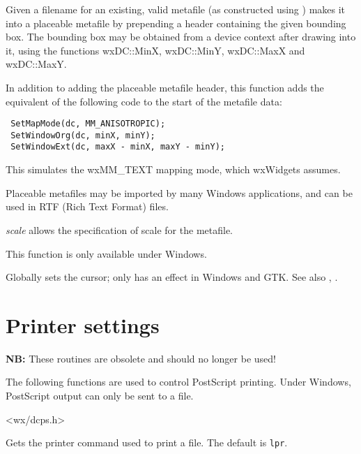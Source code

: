 Given a filename for an existing, valid metafile (as constructed using )
makes it into a placeable metafile by prepending a header containing the given
bounding box. The bounding box may be obtained from a device context after drawing
into it, using the functions wxDC::MinX, wxDC::MinY, wxDC::MaxX and wxDC::MaxY.

In addition to adding the placeable metafile header, this function adds
the equivalent of the following code to the start of the metafile data:

\begin{verbatim}
 SetMapMode(dc, MM_ANISOTROPIC);
 SetWindowOrg(dc, minX, minY);
 SetWindowExt(dc, maxX - minX, maxY - minY);
\end{verbatim}

This simulates the wxMM\_TEXT mapping mode, which wxWidgets assumes.

Placeable metafiles may be imported by many Windows applications, and can be
used in RTF (Rich Text Format) files.

{\it scale} allows the specification of scale for the metafile.

This function is only available under Windows.


\label{wxsetcursor}


Globally sets the cursor; only has an effect in Windows and GTK.
See also , .



\section{Printer settings}\label{printersettings}

{\bf NB:} These routines are obsolete and should no longer be used!

The following functions are used to control PostScript printing. Under
Windows, PostScript output can only be sent to a file.


<wx/dcps.h>


\label{wxgetprintercommand}


Gets the printer command used to print a file. The default is {\tt lpr}.


